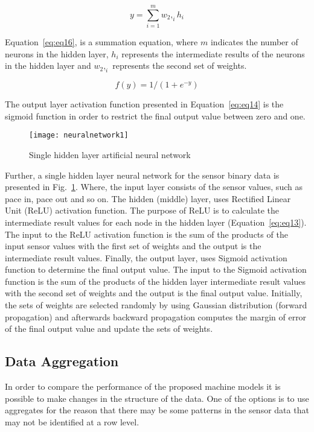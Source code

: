 \documentclass[runningheads]{llncs}
\begin{document}
\begin{equation}
\label{eq:eq16}
y = \sum_{i=1}^{m} w_2,_ih_i
\end{equation}

Equation~\ref{eq:eq16}, is a summation equation, where $m$ indicates the number of neurons in the hidden layer, $h_i$ represents the intermediate results of the neurons in the hidden layer and $w_2,_i$ represents the second set of weights.

\begin{equation}
\label{eq:eq14}
f(y) = 1/(1 + e^{-y})
\end{equation}

The output layer activation function presented in Equation~\ref{eq:eq14} is the sigmoid function in order to restrict the final output value between zero and one.

\begin{figure}
\centering
\texttt{[image: neuralnetwork1]} 
\caption{Single hidden layer artificial neural network}
\label{fig:neuralnetwork}
\end{figure}

Further, a single hidden layer neural network for the sensor binary data is presented in Fig.~\ref{fig:neuralnetwork}. Where, the input layer consists of the sensor values, such as pace in, pace out and so on. The hidden (middle) layer, uses Rectified Linear Unit (ReLU) activation function. The purpose of  ReLU is to calculate the intermediate result values for each node in the hidden layer (Equation~\ref{eq:eq13}). The input to the ReLU activation function is the sum of the products of the input sensor values with the first set of weights and the output is the intermediate result values. Finally, the output layer, uses Sigmoid activation function to determine the final output value. The input to the Sigmoid activation function is the sum of the products of the hidden layer intermediate result values with the second set of weights and the output is the final output value. Initially, the sets of weights are selected randomly by using Gaussian distribution (forward propagation) and afterwards backward propagation computes the margin of error of the final output value and update the sets of weights. 



\subsection {Data Aggregation}
\label{sec:aggregation}
In order to compare the performance of the proposed machine models it is possible to make changes in the structure of the data. One of the options is to use aggregates for the reason that there may be some patterns in the sensor data that may not be identified at a row level. 
\end{document}
